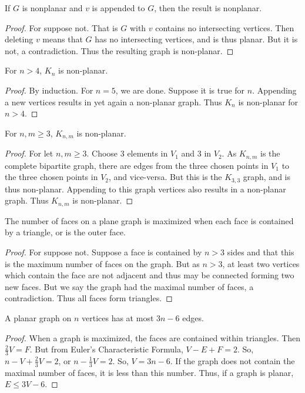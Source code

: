     \begin{theorem}
    If $G$ is nonplanar and $v$ is appended to $G$, then the result is nonplanar.
    \end{theorem}
    \begin{proof}
    For suppose not. That is $G$ with $v$ contains no intersecting vertices. Then deleting $v$ means that $G$ has no intersecting vertices, and is thus planar. But it is not, a contradiction. Thus the resulting graph is non-planar.
    \end{proof}
    \begin{theorem}
    For $n>4$, $K_n$ is non-planar.
    \end{theorem}
    \begin{proof}
    By induction. For $n=5$, we are done. Suppose it is true for $n$. Appending a new vertices results in yet again a non-planar graph. Thus $K_n$ is non-planar for $n>4$.
    \end{proof}
    \begin{theorem}
    For $n,m\geq 3$, $K_{n,m}$ is non-planar.
    \end{theorem}
    \begin{proof}
    For let $n,m\geq 3$. Choose $3$ elements in $V_1$ and $3$ in $V_2$. As $K_{n,m}$ is the complete bipartite graph, there are edges from the three chosen points in $V_1$ to the three chosen points in $V_2$, and vice-versa. But this is the $K_{3,3}$ graph, and is thus non-planar. Appending to this graph vertices also results in a non-planar graph. Thus $K_{n,m}$ is non-planar.
    \end{proof}
    \begin{theorem}
    The number of faces on a plane graph is maximized when each face is contained by a triangle, or is the outer face.
    \end{theorem}
    \begin{proof}
    For suppose not. Suppose a face is contained by $n>3$ sides and that this is the maximum number of faces on the graph. But as $n>3$, at least two vertices which contain the face are not adjacent and thus may be connected forming two new faces. But we say the graph had the maximal number of faces, a contradiction. Thus all faces form triangles.
    \end{proof}
    \begin{theorem}
    A planar graph on $n$ vertices has at most $3n-6$ edges.
    \end{theorem}
    \begin{proof}
    When a graph is maximized, the faces are contained within triangles. Then $\frac{2}{3}V= F$. But from Euler's Characteristic Formula, $V-E+F=2$. So, $n-V+\frac{2}{3}V = 2$, or $n-\frac{1}{3}V = 2$. So, $V=3n-6$. If the graph does not contain the maximal number of faces, it is less than this number. Thus, if a graph is planar, $E\leq 3V-6$.
    \end{proof}
